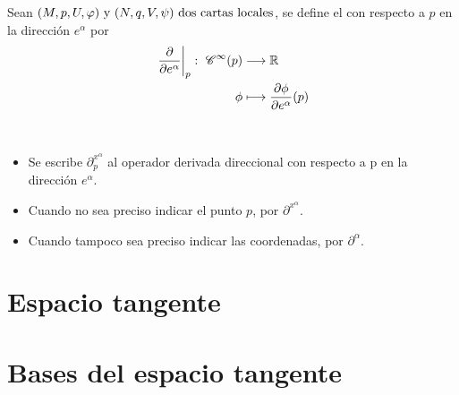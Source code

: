 \begin{definition}
  Sean $(M,p,U,\varphi)\textmd{ y } (N,q,V,\psi)\textmd{ dos cartas locales}$, se define el
   con
  respecto a $p$ en la dirección $e^\alpha$ por
  \begin{equation}
    \begin{alignedat}{1}
      \label{eq:operador-parcial-funcion-punto}
      \left.\frac{\partial}{\partial e^\alpha}\right|_p:\ \mathscr{C}^\infty(p) & \longrightarrow \mathbb{R} \\ \phi & \longmapsto \frac{\partial
      \phi}{\partial e^\alpha}(p)
    \end{alignedat}
  \end{equation}
\end{definition}
\begin{notation}
  \
  \begin{itemize}
    \item Se escribe $\partial^{x^\alpha}_p$ al operador derivada direccional con respecto a p en la dirección
    $e^\alpha$.
    \item Cuando no sea preciso indicar el punto $p$, por $\partial^{x^\alpha}$.
    \item Cuando tampoco sea preciso indicar las coordenadas, por $\partial^\alpha$.
  \end{itemize}
\end{notation}


\section{Espacio tangente}\label{sec:espacio-tangente}



\section{Bases del espacio tangente}\label{sec:bases-del-espacio-tangente}



